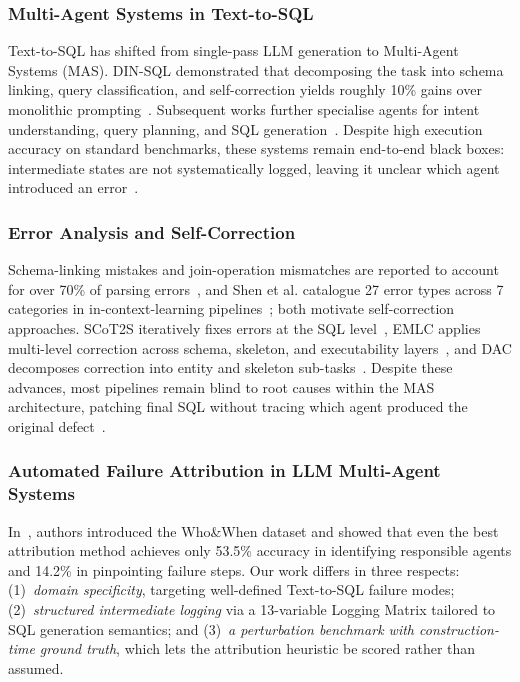 \documentclass[conference]{IEEEtran}
\begin{document}
\subsubsection{Multi-Agent Systems in Text-to-SQL}
Text-to-SQL has shifted from single-pass LLM generation to Multi-Agent Systems (MAS). DIN-SQL demonstrated that decomposing the task into schema linking, query classification, and self-correction yields roughly 10\% gains over monolithic prompting~\cite{pourreza_din-sql_2023}. Subsequent works further specialise agents for intent understanding, query planning, and SQL generation~\cite{chaturvedi_sqlofthought_2025, wang_mac-sql_2025, cen_sqlfixagent_2025}. Despite high execution accuracy on standard benchmarks, these systems remain end-to-end black boxes: intermediate states are not systematically logged, leaving it unclear which agent introduced an error~\cite{lei_spider2_2025}.

\subsubsection{Error Analysis and Self-Correction}
Schema-linking mistakes and join-operation mismatches are reported to account
for over 70\% of parsing errors~\cite{zhu_scot2s_2025}, and Shen et al. catalogue
27 error types across 7 categories in in-context-learning
pipelines~\cite{shen_icl_errors_2026}; both motivate self-correction approaches. SCoT2S iteratively fixes errors at the SQL level~\cite{zhu_scot2s_2025}, EMLC applies multi-level correction across schema, skeleton, and executability layers~\cite{lei_emlc_2026}, and DAC decomposes correction into entity and skeleton sub-tasks~\cite{wang_dac_2025}. Despite these advances, most pipelines remain blind to root causes within the MAS architecture, patching final SQL without tracing which agent produced the original defect~\cite{shen_icl_errors_2026}.

\subsubsection{Automated Failure Attribution in LLM Multi-Agent Systems}
In~\cite{zhang2025which}, authors introduced the Who\&When dataset and showed that even the best attribution method achieves only 53.5\% accuracy in identifying responsible agents and 14.2\% in pinpointing failure steps. Our work differs in three respects: (1)~\emph{domain specificity}, targeting well-defined Text-to-SQL failure modes; (2)~\emph{structured intermediate logging} via a 13-variable Logging Matrix tailored to SQL generation semantics; and (3)~\emph{a perturbation benchmark with construction-time ground truth}, which lets the attribution heuristic be scored rather than assumed.
\end{document}
